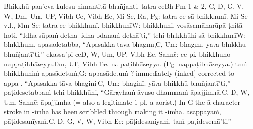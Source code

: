 Bhikkhū pan'eva kulesu nimantitā bhuñjanti, tatra ce\makeatletter\hyperlink{endnote-appendix}\makeatother Bh Pm 1 & 2, C, D, G, V, W, Dm, Um, UP, Vibh Ce, Vibh Ee, Mi Se, Ra, Pg: tatra ce sā bhikkhunī. Mi Se v.l., Mm Se: tatra ce
bhikkhunī. bhikkhunī\makeatletter\hyperlink{endnote-appendix}\makeatother W: bhikkhuni. vosāsamānarūpā ṭhitā hoti, ``Idha sūpaṁ detha, idha odanaṁ dethā'ti,'' tehi bhikkhūhi sā bhikkhunī\makeatletter\hyperlink{endnote-appendix}\makeatother W: bhikkhuni. apasādetabbā, ``Apasakka tāva bhagini,\makeatletter\hyperlink{endnote-appendix}\makeatother C, Um: bhaginī. yāva bhikkhū bhuñjantī'ti,'' ekassa'pi ce\makeatletter\hyperlink{endnote-appendix}\makeatother D, W, Um, UP, Vibh Ee, Sannē: ce pi. bhikkhuno nappaṭibhāseyya\makeatletter\hyperlink{endnote-appendix}\makeatother Dm, UP, Vibh Ee: na paṭibhāseyya. (Pg: nappaṭibhāseyya.) taṁ bhikkhuniṁ apasādetuṁ,\makeatletter\hyperlink{endnote-appendix}\makeatother G: appasādetuṁ ? immediately (inked) corrected to appa-. ``Apasakka tāva bhagini,\makeatletter\hyperlink{endnote-appendix}\makeatother C, Um: bhaginī. yāva bhikkhū bhuñjantī'ti,'' paṭidesetabbaṁ tehi bhikkhūhi, ``Gārayhaṁ āvuso dhammaṁ āpajjimhā,\makeatletter\hyperlink{endnote-appendix}\makeatother C, D, W, Um, Sannē: āpajjimha (= also a legitimate 1 pl. a-aorist.) In G the ā character stroke in -imhā has been scribbled
through making it -imha. asappāyaṁ, pāṭidesanīyaṁ,\makeatletter\hyperlink{endnote-appendix}\makeatother C, D, G, V, W, Vibh Ee: pāṭidesaniyaṁ. taṁ paṭidesemā'ti.''



